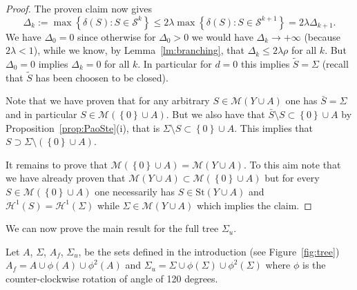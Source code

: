 \documentclass{amsart}
\renewcommand{\H}{\mathcal H}
\newcommand{\ENCLOSE}[1]{\left\{#1\right\}}
\newcommand{\St}{\mathrm{St}}
\newcommand{\M}{\mathcal{M}}
\renewcommand{\H}{\mathcal{H}}
\renewcommand{\S}{\mathcal{S}}
\theoremstyle{definition}
\theoremstyle{remark}
\begin{document}
\begin{proof}
The proven claim now gives 
\[
  \Delta_k 
  := \max\ENCLOSE{\delta(S)\colon S\in \S^k}
   \le 2\lambda \max\ENCLOSE{\delta(S)\colon S\in \S^{k+1}}
   = 2 \lambda \Delta_{k+1}.
\]
We have $\Delta_0 = 0$ since otherwise for 
$\Delta_0>0$ we would have 
$\Delta_k\to +\infty$ (because $2\lambda <1$), while we know,
by Lemma~\ref{lm:branching}, that $\Delta_k \le 2\lambda\rho$
for all $k$.
But $\Delta_0 =0$ implies $\Delta_k=0$ for all $k$.
In particular for $d=0$ this implies $\tilde S=\Sigma$ 
(recall that $\tilde S$ has been choosen to be closed).

Note that we have proven that for any arbitrary $S\in \M(Y\cup A)$ 
one has $\bar S= \Sigma$ and in particular $S\in \M(\ENCLOSE 0 \cup A)$. 
But we also have that $\bar S \setminus S \subset \ENCLOSE{0}\cup A$
by Proposition~\ref{prop:PaoSte}(i),
that is $\Sigma\setminus S \subset \ENCLOSE 0 \cup A$.
This implies that $S\supset \Sigma\setminus(\ENCLOSE 0 \cup A)$.

It remains to prove that $\M(\ENCLOSE 0 \cup A) = \M(Y\cup A)$.
To this aim note that we have already proven 
that $\M(Y\cup A) \subset \M(\ENCLOSE 0 \cup A)$
but for every $S\in \M(\ENCLOSE 0 \cup A)$ one necessarily has 
$S\in \St(Y\cup A)$ and $\H^1(S)=\H^1(\Sigma)$ while
$\Sigma \in \M(Y\cup A)$ which implies the claim.

\end{proof}

We can now prove the main result for the full tree $\Sigma_u$.

Let $A$, $\Sigma$, $A_f$, $\Sigma_u$, be the sets defined in the introduction
(see Figure~\ref{fig:tree})
$A_f = A \cup \phi(A)\cup \phi^2(A)$ and 
$\Sigma_u = \Sigma \cup \phi(\Sigma)\cup \phi^2(\Sigma)$
where $\phi$ is the counter-clockwise rotation of angle of 120 degrees.
\end{document}
